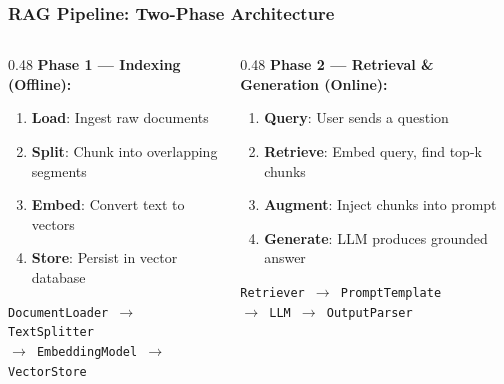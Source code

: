 \begin{frame}\frametitle{RAG Pipeline: Two-Phase Architecture}

\begin{columns}
  \begin{column}{0.48\textwidth}
    \textbf{Phase 1 --- Indexing (Offline):}
    \begin{enumerate}
    \item \textbf{Load}: Ingest raw documents
    \item \textbf{Split}: Chunk into overlapping segments
    \item \textbf{Embed}: Convert text to vectors
    \item \textbf{Store}: Persist in vector database
    \end{enumerate}
    \vspace{0.3cm}
    \texttt{DocumentLoader $\to$ TextSplitter}\\
    \texttt{$\to$ EmbeddingModel $\to$ VectorStore}
  \end{column}
  \begin{column}{0.48\textwidth}
    \textbf{Phase 2 --- Retrieval \& Generation (Online):}
    \begin{enumerate}
    \item \textbf{Query}: User sends a question
    \item \textbf{Retrieve}: Embed query, find top-k chunks
    \item \textbf{Augment}: Inject chunks into prompt
    \item \textbf{Generate}: LLM produces grounded answer
    \end{enumerate}
    \vspace{0.3cm}
    \texttt{Retriever $\to$ PromptTemplate}\\
    \texttt{$\to$ LLM $\to$ OutputParser}
  \end{column}
\end{columns}

\vspace{0.3cm}
\begin{center}
\end{center}
\end{frame}



